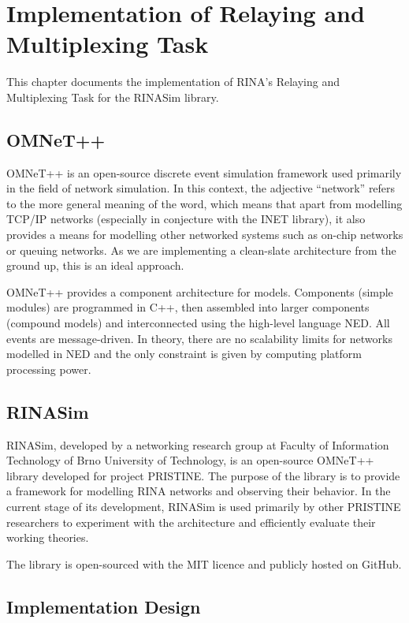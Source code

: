 \chapter{Implementation of Relaying and Multiplexing Task}\label{implementation}

    This chapter documents the implementation of RINA's Relaying and Multiplexing Task for the RINASim library.

    \section{OMNeT++}

        OMNeT++ is an open-source discrete event simulation framework used primarily in the field of network simulation. In this context, the adjective ``network'' refers to the more general meaning of the word, which means that apart from modelling TCP/IP networks (especially in conjecture with the INET library), it also provides a means for modelling other networked systems such as on-chip networks or queuing networks. As we are implementing a clean-slate architecture from the ground up, this is an ideal approach.

        OMNeT++ provides a component architecture for models. Components (simple modules) are programmed in C++, then assembled into larger components (compound models) and interconnected using the high-level language NED. All events are message-driven. In theory, there are no scalability limits for networks modelled in NED and the only constraint is given by computing platform processing power.

    \section{RINASim}

        RINASim, developed by a networking research group at Faculty of Information Technology of Brno University of Technology, is an open-source OMNeT++ library developed for project PRISTINE. The purpose of the library is to provide a framework for modelling RINA networks and observing their behavior. In the current stage of its development, RINASim is used primarily by other PRISTINE researchers to experiment with the architecture and efficiently evaluate their working theories.

        The library is open-sourced with the MIT licence and publicly hosted on GitHub.

    \section{Implementation Design}

